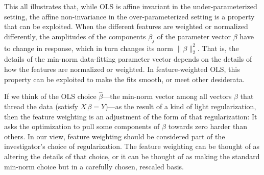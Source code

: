 \documentclass[12pt,letterpaper]{article}
\begin{document}
This all illustrates that, while OLS is affine invariant in the under-parameterized setting, the affine non-invariance in the over-parameterized setting is a property that can be exploited.
When the different features are weighted or normalized differently, the amplitudes of the components $\beta_j$ of the parameter vector $\beta$ have to change in response, which in turn changes its norm $\|\beta\|_2^2$.
That is, the details of the min-norm data-fitting parameter vector depends on the details of how the features are normalized or weighted.
In feature-weighted OLS, this property can be exploited to make the fits smooth, or meet other desiderata.

If we think of the OLS choice $\hat{\beta}$---the min-norm vector among all vectors $\beta$ that thread the data (satisfy $X\,\beta = Y$)---as the result of a kind of light regularization, then the feature weighting is an adjustment of the form of that regularization:
It asks the optimization to pull some components of $\beta$ towards zero harder than others.
In our view, feature weighting should be considered part of the investigator's choice of regularization.
The feature weighting can be thought of as altering the details of that choice, or it can be thought of as making the standard min-norm choice but in a carefully chosen, rescaled basis.
\end{document}
